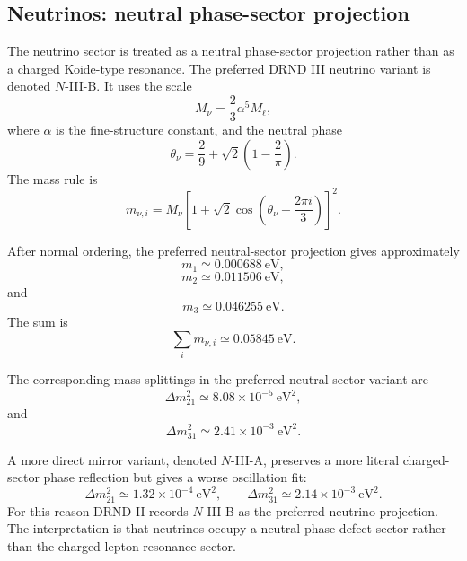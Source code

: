 \documentclass[12pt]{iopart}
\begin{document}
\subsection{Neutrinos: neutral phase-sector projection}

The neutrino sector is treated as a neutral phase-sector projection rather than as a charged Koide-type resonance. The preferred DRND III neutrino variant is denoted \(N\)-III-B. It uses the scale
\begin{equation}
M_\nu
=
\frac{2}{3}\alpha^5M_\ell,
\label{eq:neutrino_scale}
\end{equation}
where \(\alpha\) is the fine-structure constant, and the neutral phase
\begin{equation}
\theta_\nu
=
\frac{2}{9}
+
\sqrt{2}\left(1-\frac{2}{\pi}\right).
\label{eq:theta_neutrino}
\end{equation}
The mass rule is
\begin{equation}
m_{\nu,i}
=
M_\nu
\left[
1+\sqrt{2}\cos\left(
\theta_\nu+\frac{2\pi i}{3}
\right)
\right]^2.
\label{eq:neutrino_mass_rule}
\end{equation}

After normal ordering, the preferred neutral-sector projection gives approximately
\begin{equation}
m_1\simeq 0.000688~\mathrm{eV},
\end{equation}
\begin{equation}
m_2\simeq 0.011506~\mathrm{eV},
\end{equation}
and
\begin{equation}
m_3\simeq 0.046255~\mathrm{eV}.
\end{equation}
The sum is
\begin{equation}
\sum_i m_{\nu,i}
\simeq
0.05845~\mathrm{eV}.
\end{equation}

The corresponding mass splittings in the preferred neutral-sector variant are
\begin{equation}
\Delta m_{21}^2
\simeq
8.08\times10^{-5}~\mathrm{eV}^2,
\end{equation}
and
\begin{equation}
\Delta m_{31}^2
\simeq
2.41\times10^{-3}~\mathrm{eV}^2.
\end{equation}

A more direct mirror variant, denoted \(N\)-III-A, preserves a more literal charged-sector phase reflection but gives a worse oscillation fit:
\begin{equation}
\Delta m_{21}^2
\simeq
1.32\times10^{-4}~\mathrm{eV}^2,
\qquad
\Delta m_{31}^2
\simeq
2.14\times10^{-3}~\mathrm{eV}^2.
\end{equation}
For this reason DRND II records \(N\)-III-B as the preferred neutrino projection. The interpretation is that neutrinos occupy a neutral phase-defect sector rather than the charged-lepton resonance sector.
\end{document}
